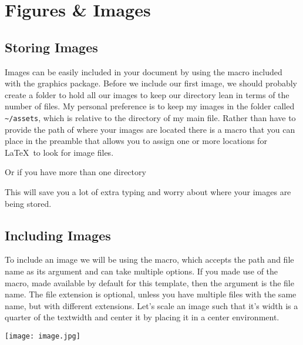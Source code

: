 \chapter{Figures \& Images}

\section{Storing Images}

Images can be easily included in your document by using the 
macro included with the graphics package. Before we include our first image, we 
should probably create a folder to hold all our images to keep our directory 
lean in terms of the number of files.  My personal preference is to keep my 
images in the folder called \verb!~/assets!, which is relative to the directory
of my main file.  Rather than have to provide the path of where your images are 
located there is a  macro that you can place in the preamble
that allows you to assign one or more locations for \LaTeX ~to look for image 
files.
\begin{dispListing}
\graphicspath{{/assets/}}
\end{dispListing}
Or if you have more than one directory
\begin{dispListing}
\graphicspath{{/assets/}{/images/}{/pdfs/}}
\end{dispListing}
This will save you a lot of extra typing and worry about where your images are
being stored.

\section{Including Images}

To include an image we will be using the  macro, which accepts 
the path and file name as its argument and can take multiple options.  If you made
use of the  macro, made available by default for this template, 
then the argument is the file name.  The file extension is optional, unless you 
have multiple files with the same name, but with different extensions.  Let's 
scale an image such that it's width is a quarter of the textwidth and center 
it by placing it in a center environment.
\begin{dispExample}
\begin{center}
\texttt{[image: image.jpg]}
\end{center}
\end{dispExample}


